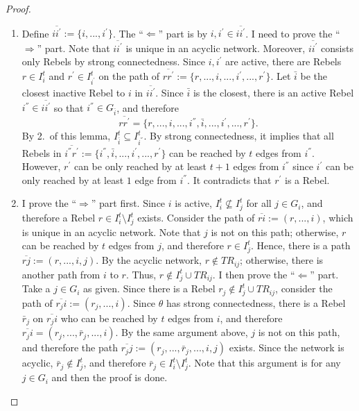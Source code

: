 \documentclass[12pt,letter]{article}
\theoremstyle{definition}
\theoremstyle{definition}
\theoremstyle{remark}
\theoremstyle{claim}
\begin{document}
\begin{proof}
\begin{enumerate}
\item Define $\overline{ii^{'}}:=\{i,...,i^{'}\}$. The ``$\Leftarrow$'' part is by $i,i^{'}\in \overline{ii^{'}}$. I need to prove the ``$\Rightarrow$'' part. Note that $\overline{ii^{'}}$ is unique in an acyclic network. Moreover, $\overline{ii^{'}}$ consists only Rebels by strong connectedness. Since $i,i^{'}$ are active, there are Rebels $r\in I^t_i$ and $r^{'}\in I^t_{i^{'}}$ on the path of $\overline{rr^{'}}:=\{r,...,i,...,i^{'},...,r^{'}\}$. Let $\bar{i}$ be the closest inactive Rebel to $i$ in $\overline{ii^{'}}$. Since $\bar{i}$ is the closest, there is an active Rebel $i^{''}\in \overline{ii^{'}}$ so that $i^{''}\in G_{\bar{i}}$, and therefore 
\[\overline{rr^{'}}=\{r,...,i,...,i^{''},\bar{i},...,i^{'},...,r^{'}\}.\] 
By 2.~of this lemma, $I^t_{\bar{i}}\subseteq I^t_{i^{''}}$. By strong connectedness, it implies that all Rebels in $\overline{i^{''}r^{'}}:=\{i^{''},\bar{i},...,i^{'},...,r^{'}\}$ can be reached by $t$ edges from $i^{''}$. However, $r^{'}$ can be only reached by at least $t+1$ edges from $i^{''}$ since $i^{'}$ can be only reached by at least $1$ edge from $i^{''}$. It contradicts that $r^{'}$ is a Rebel.

\item I prove the ``$\Rightarrow$'' part first. Since $i$ is active, $I^t_i\not\subseteq I^t_j$ for all $j\in G_i$, and therefore a Rebel $r\in I^t_i\setminus I^t_j$ exists. Consider the path of $\overline{ri}:=(r,...,i)$, which is unique in an acyclic network. Note that $j$ is not on this path; otherwise, $r$ can be reached by $t$ edges from $j$, and therefore $r\in I^t_j$. Hence, there is a path $\overline{rj}:=(r,...,i,j)$. By the acyclic network, $r\not\in TR_{ij}$; otherwise, there is another path from $i$ to $r$. Thus, $r\not\in I^t_j\cup TR_{ij}$. I then prove the ``$\Leftarrow$'' part. Take a $j\in G_i$ as given. Since there is a Rebel $r_j\not\in I^t_j\cup TR_{ij}$, consider the path of $\overline{r_ji}:=(r_j,...,i)$. Since $\theta$ has strong connectedness, there is a Rebel $\bar{r}_j$ on $\overline{r_ji}$ who can be reached by $t$ edges from $i$, and therefore $\overline{r_ji}=(r_j,...,\bar{r}_j,...,i)$. By the same argument above, $j$ is not on this path, and therefore the path $\overline{r_jj}:=(r_j,...,\bar{r}_j,...,i,j)$ exists. Since the network is acyclic, $\bar{r}_j\not\in I^t_j$, and therefore $\bar{r}_j\in I^t_i\setminus I^t_j$. Note that this argument is for any $j\in G_i$ and then the proof is done.


\end{enumerate}
\end{proof}
\end{document}
